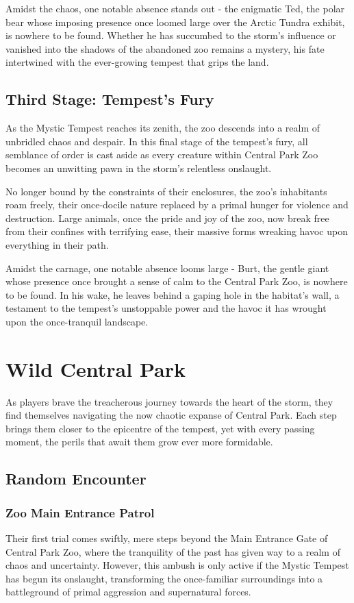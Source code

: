 Amidst the chaos, one notable absence stands out - the enigmatic Ted, the polar bear whose imposing presence once loomed large over the Arctic Tundra exhibit, is nowhere to be found. Whether he has succumbed to the storm's influence or vanished into the shadows of the abandoned zoo remains a mystery, his fate intertwined with the ever-growing tempest that grips the land.
\subsection*{Third Stage: Tempest's Fury}
As the Mystic Tempest reaches its zenith, the zoo descends into a realm of unbridled chaos and despair. In this final stage of the tempest's fury, all semblance of order is cast aside as every creature within Central Park Zoo becomes an unwitting pawn in the storm's relentless onslaught.

No longer bound by the constraints of their enclosures, the zoo's inhabitants roam freely, their once-docile nature replaced by a primal hunger for violence and destruction. Large animals, once the pride and joy of the zoo, now break free from their confines with terrifying ease, their massive forms wreaking havoc upon everything in their path.\\\hfill

Amidst the carnage, one notable absence looms large - Burt, the gentle giant whose presence once brought a sense of calm to the Central Park Zoo, is nowhere to be found. In his wake, he leaves behind a gaping hole in the habitat's wall, a testament to the tempest's unstoppable power and the havoc it has wrought upon the once-tranquil landscape.

\section*{Wild Central Park}
As players brave the treacherous journey towards the heart of the storm, they find themselves navigating the now chaotic expanse of Central Park. Each step brings them closer to the epicentre of the tempest, yet with every passing moment, the perils that await them grow ever more formidable.

\subsection*{Random Encounter}
\subsubsection*{Zoo Main Entrance Patrol}
Their first trial comes swiftly, mere steps beyond the Main Entrance Gate of Central Park Zoo, where the tranquility of the past has given way to a realm of chaos and uncertainty. However, this ambush is only active if the Mystic Tempest has begun its onslaught, transforming the once-familiar surroundings into a battleground of primal aggression and supernatural forces.

